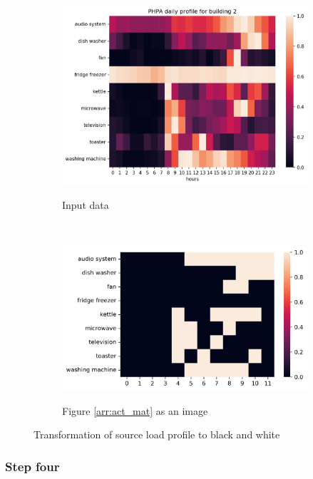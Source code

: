 \begin{figure}[H]
	\begin{subfigure}{.5\textwidth}
		\caption{Input data}
		\includegraphics[width=1\linewidth]{../Figures/LPS/PHPA.png}
		\label{fig:ec_PHPA}
	\end{subfigure}%
	~ 
	\begin{subfigure}{.5\textwidth}
		\caption{Figure \protect\ref{arr:act_mat} as an image}
		\includegraphics[width=1\linewidth]{../Figures/LPS/PHPA_EC.png}
		\label{fig:ec_PHPA_bw}
	\end{subfigure}%

	\caption{Transformation of source load profile to black and white}
\end{figure}

\subsubsection{Step four}

